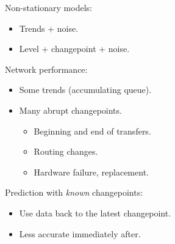 \documentclass[pdf,allen]{prosper}
\begin{document}
\begin{slide}{}

Non-stationary models:

\begin{itemize}

\item Trends + noise. 

\item Level + changepoint + noise.

\end{itemize}


\end{slide}

\begin{slide}{}

Network performance:

\begin{itemize}

\item Some trends (accumulating queue). 

\item Many abrupt changepoints.

\begin{itemize}

\item Beginning and end of transfers.

\item Routing changes.

\item Hardware failure, replacement.

\end{itemize}

\end{itemize}


\end{slide}

\begin{slide}{}

Prediction with {\em known} changepoints:

\begin{itemize}

\item Use data back to the latest changepoint.

\item Less accurate immediately after.

\end{itemize}


\end{slide}
\end{document}
